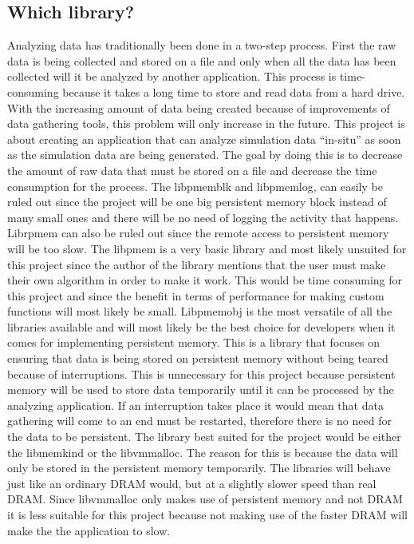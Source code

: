 \documentclass[12pt,a4paper,UKenglish]{article}
\begin{document}
\subsection{Which library?}
Analyzing data has traditionally been done in a two-step process. First the raw data is being collected and stored on a file and only when all the data has been collected will it be analyzed by another application. This process is time-consuming because it takes a long time to store and read data from a hard drive. With the increasing amount of data being created because of improvements of data gathering tools, this problem will only increase in the future. This project is about creating an application that can analyze simulation data “in-situ” as soon as the simulation data are being generated. The goal by doing this is to decrease the amount of raw data that must be stored on a file and decrease the time consumption for the process.
\newline\newline
The libpmemblk and libpmemlog, can easily be ruled out since the project will be one big persistent memory block instead of many small ones and there will be no need of logging the activity that happens. Librpmem can also be ruled out since the remote access to persistent memory will be too slow. The libpmem is a very basic library and most likely unsuited for this project since the author of the library mentions that the user must make their own algorithm in order to make it work. This would be time consuming for this project and since the benefit in terms of performance for making custom functions will most likely be small. 
\newline\newline
Libpmemobj is the most versatile of all the libraries available and will most likely be the best choice for developers when it comes for implementing persistent memory. This is a library that focuses on ensuring that data is being stored on persistent memory without being teared because of interruptions. This is unnecessary for this project because persistent memory will be used to store data temporarily until it can be processed by the analyzing application. If an interruption takes place it would mean that data gathering will come to an end must be restarted, therefore there is no need for the data to be persistent. 
\newline\newline
The library best suited for the project would be either the libmemkind or the libvmmalloc. The reason for this is because the data will only be stored in the persistent memory temporarily. The libraries will behave just like an ordinary DRAM would, but at a slightly slower speed than real DRAM. Since libvmmalloc only makes use of persistent memory and not DRAM it is less suitable for this project because not making use of the faster DRAM will make the the application to slow.
\end{document}
